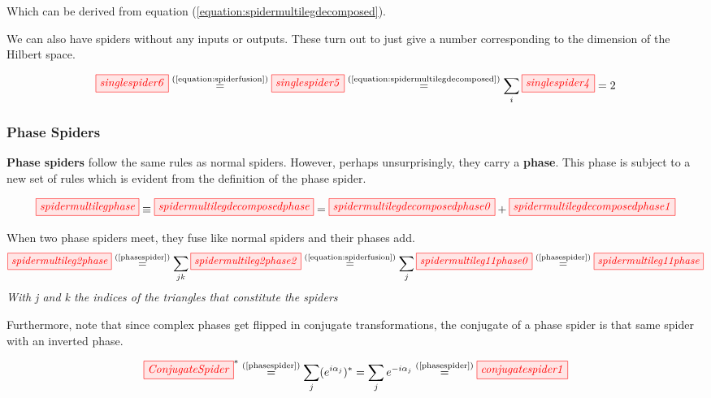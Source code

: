 \documentclass[]{article}
\newcommand{\equaltext}[1]{\ensuremath{\stackrel{\text{#1}}{=}}}
\begin{document}
Which can be derived from equation (\ref{equation:spidermultilegdecomposed}).

We can also have spiders without any inputs or outputs. These turn out to just give a number corresponding to the dimension of the Hilbert space.

\begin{equation}
	\label{equation:singlespider}
	\tikzfig{singlespider6} \equaltext{(\ref{equation:spiderfusion})}
	\tikzfig{singlespider5}  \equaltext{(\ref{equation:spidermultilegdecomposed})}
	\sum\limits_i \tikzfig{singlespider4} = 2
\end{equation}



\subsubsection{Phase Spiders}
\label{phasespiders}

\textbf{Phase spiders} follow the same rules as normal spiders. However, perhaps unsurprisingly, they carry a \textbf{phase}. This phase is subject to a new set of rules which is evident from the definition of the phase spider. 

\begin{equation}
\label{phasespider}
\tikzfig{spidermultilegphase} \equiv \tikzfig{spidermultilegdecomposedphase} = \tikzfig{spidermultilegdecomposedphase0} + \tikzfig{spidermultilegdecomposedphase1}
\end{equation}

When two phase spiders meet, they fuse like normal spiders and their phases add.
\begin{equation}
\label{equation:phasespiderfusion}
	\tikzfig{spidermultileg2phase} \equaltext{(\ref{phasespider})} \sum\limits_{jk} \tikzfig{spidermultileg2phase2} \equaltext{(\ref{equation:spiderfusion})} \sum\limits_{j} \tikzfig{spidermultileg11phase0} \equaltext{(\ref{phasespider})} \tikzfig{spidermultileg11phase}
\end{equation}
\textit{With j and k the indices of the triangles that constitute the spiders}

Furthermore, note that since complex phases get flipped in conjugate transformations, the conjugate of a phase spider is that same spider with an inverted phase.

\begin{equation}
\label{equation:conjugatespider}
\tikzfig{ConjugateSpider}^* \equaltext{(\ref{phasespider})} \sum\limits_{j}(e^{i\alpha_j})^*= \sum\limits_{j}e^{-i\alpha_j} \equaltext{(\ref{phasespider})} \tikzfig{conjugatespider1}
\end{equation}
\end{document}
